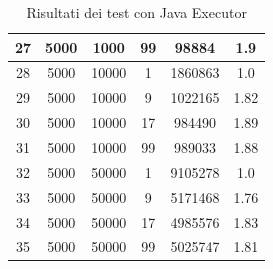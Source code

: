 \documentclass[12pt,a4paper,openright,twoside]{book}
\begin{document}
\begin{table}[h!]
\begin{tabular}{ |c|c|c|c|c|c| }
 \hline
27 & 5000 & 1000 & 99 & 98884 & 1.9 \\ 
 \hline
28 & 5000 & 10000 & 1 & 1860863 & 1.0 \\ 
 \hline
29 & 5000 & 10000 & 9 & 1022165 & 1.82 \\ 
 \hline
30 & 5000 & 10000 & 17 & 984490 & 1.89 \\ 
 \hline
31 & 5000 & 10000 & 99 & 989033 & 1.88 \\ 
 \hline
32 & 5000 & 50000 & 1 & 9105278 & 1.0 \\ 
 \hline
33 & 5000 & 50000 & 9 & 5171468 & 1.76 \\ 
 \hline
34 & 5000 & 50000 & 17 & 4985576 & 1.83 \\ 
 \hline
35 & 5000 & 50000 & 99 & 5025747 & 1.81 \\ 
 \hline
	\end{tabular}
	\caption{Risultati dei test con Java Executor}
	\label{tab:table1}
\end{table}
\end{document}
